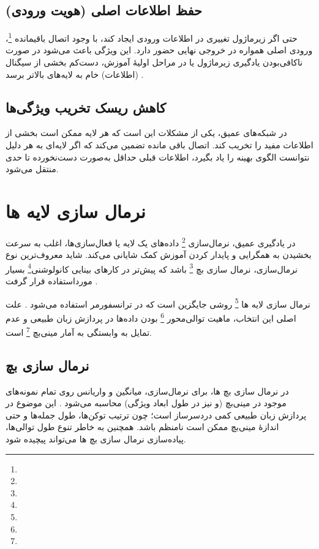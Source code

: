 \subsection*{حفظ اطلاعات اصلی (هویت ورودی)}
حتی اگر زیرماژول تغییری در اطلاعات ورودی ایجاد کند، با وجود اتصال باقیمانده \footnote{}، ورودی اصلی همواره در خروجی نهایی حضور دارد.
این ویژگی باعث می‌شود در صورت ناکافی‌بودن یادگیری زیرماژول یا در مراحل اولیهٔ آموزش، دست‌کم بخشی از سیگنال (اطلاعات) خام به لایه‌های بالاتر برسد \cite{he2016deep,vaswani2017attention}.

\subsection*{کاهش ریسک تخریب ویژگی‌ها}
در شبکه‌های عمیق، یکی از مشکلات این است که هر لایه ممکن است بخشی از اطلاعات مفید را تخریب کند. اتصال باقی مانده تضمین می‌کند که اگر لایه‌ای به هر دلیل نتوانست الگوی بهینه را یاد بگیرد، اطلاعات قبلی حداقل به‌صورت دست‌نخورده تا حدی منتقل می‌شود.


\section{نرمال سازی لایه ها}

در یادگیری عمیق، نرمال‌سازی \footnote{} داده‌های یک لایه یا فعال‌سازی‌ها، اغلب به سرعت بخشیدن به همگرایی و پایدار کردن آموزش کمک شایانی می‌کند. شاید معروف‌ترین نوع نرمال‌سازی، نرمال سازی بچ \footnote{} باشد که پیش‌تر در کارهای بینایی کانولوشنی\footnote{} بسیار مورداستفاده قرار گرفت \cite{ioffe2015batch}.

نرمال سازی لایه ها \footnote{} روشی جایگزین است که در ترانسفورمر استفاده می‌شود \cite{ba2016layer,vaswani2017attention}. علت اصلی این انتخاب، ماهیت توالی‌محور \footnote{} بودن داده‌ها در پردازش زبان طبیعی و عدم تمایل به وابستگی به آمار مینی‌بچ \footnote{} است.


\subsection*{نرمال سازی بچ}
در نرمال سازی بچ ها، برای نرمال‌سازی، میانگین و واریانس روی تمام نمونه‌های موجود در مینی‌بچ (و نیز در طول ابعاد ویژگی) محاسبه می‌شود \cite{ioffe2015batch}.
این موضوع در پردازش زبان طبیعی کمی دردسرساز است؛ چون ترتیب توکن‌ها، طول جمله‌ها و حتی اندازهٔ مینی‌بچ ممکن است نامنظم باشد.
همچنین به خاطر تنوع طول توالی‌ها، پیاده‌سازی نرمال سازی بچ ها می‌تواند پیچیده شود.

